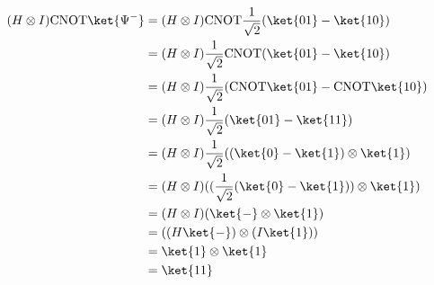 \documentclass{article}
\newcommand{\CNOT}{{\rm CNOT}}
\begin{document}
\begin{enumerate}
\begin{enumerate}
\begin{enumerate}
                        $$\begin{aligned}
                            (H\otimes I)\CNOT\ket{\Psi^-}
                             & = (H\otimes I)\CNOT\frac{1}{\sqrt{2}}(\ket{01}-\ket{10})            \\
                             & = (H\otimes I)\frac{1}{\sqrt{2}}\CNOT(\ket{01}-\ket{10})            \\
                             & = (H\otimes I)\frac{1}{\sqrt{2}}(\CNOT\ket{01}-\CNOT\ket{10})       \\
                             & = (H\otimes I)\frac{1}{\sqrt{2}}(\ket{01}-\ket{11})                 \\
                             & = (H\otimes I)\frac{1}{\sqrt{2}}((\ket{0}-\ket{1})\otimes\ket{1})   \\
                             & = (H\otimes I)((\frac{1}{\sqrt{2}}(\ket{0}-\ket{1}))\otimes\ket{1}) \\
                             & = (H\otimes I)(\ket{-}\otimes\ket{1})                               \\
                             & = ((H\ket{-})\otimes (I\ket{1}))                                    \\
                             & = \ket{1}\otimes\ket{1}                                             \\
                             & = \ket{11}
                          \end{aligned}$$

                \end{enumerate}
        \end{enumerate}
\end{enumerate}
\end{document}
